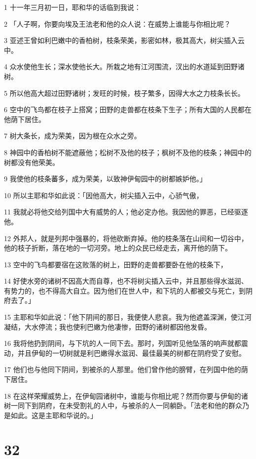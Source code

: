 \par 1 十一年三月初一日，耶和华的话临到我说：
\par 2 「人子啊，你要向埃及王法老和他的众人说：在威势上谁能与你相比呢？
\par 3 亚述王曾如利巴嫩中的香柏树，枝条荣美，影密如林，极其高大，树尖插入云中。
\par 4 众水使他生长；深水使他长大。所栽之地有江河围流，汊出的水道延到田野诸树。
\par 5 所以他高大超过田野诸树；发旺的时候，枝子繁多，因得大水之力枝条长长。
\par 6 空中的飞鸟都在枝子上搭窝；田野的走兽都在枝条下生子；所有大国的人民都在他荫下居住。
\par 7 树大条长，成为荣美，因为根在众水之旁。
\par 8 神园中的香柏树不能遮蔽他；松树不及他的枝子；枫树不及他的枝条；神园中的树都没有他荣美。
\par 9 我使他的枝条蕃多，成为荣美，以致神伊甸园中的树都嫉妒他。」
\par 10 所以主耶和华如此说：「因他高大，树尖插入云中，心骄气傲，
\par 11 我就必将他交给列国中大有威势的人；他必定办他。我因他的罪恶，已经驱逐他。
\par 12 外邦人，就是列邦中强暴的，将他砍断弃掉。他的枝条落在山间和一切谷中，他的枝子折断，落在地的一切河旁。地上的众民已经走去，离开他的荫下。
\par 13 空中的飞鸟都要宿在这败落的树上，田野的走兽都要卧在他的枝条下，
\par 14 好使水旁的诸树不因高大而自尊，也不将树尖插入云中，并且那些得水滋润、有势力的，也不得高大自立。因为他们在世人中，和下坑的人都被交与死亡，到阴府去了。」
\par 15 主耶和华如此说：「他下阴间的那日，我便使人悲哀。我为他遮盖深渊，使江河凝结，大水停流；我也使利巴嫩为他凄惨，田野的诸树都因他发昏。
\par 16 我将他扔到阴间，与下坑的人一同下去。那时，列国听见他坠落的响声就都震动，并且伊甸的一切树就是利巴嫩得水滋润、最佳最美的树都在阴府受了安慰。
\par 17 他们也与他同下阴间，到被杀的人那里。他们曾作他的膀臂，在列国中他的荫下居住。
\par 18 在这样荣耀威势上，在伊甸园诸树中，谁能与你相比呢？然而你要与伊甸的诸树一同下到阴府，在未受割礼的人中，与被杀的人一同躺卧。「法老和他的群众乃是如此。这是主耶和华说的。」

\chapter{32}

